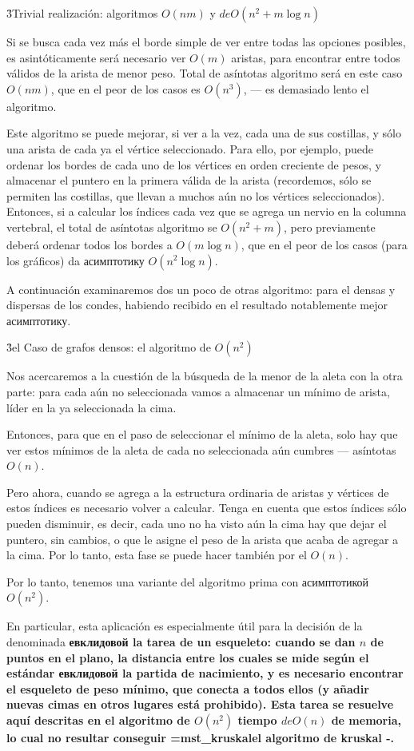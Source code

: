 \h3{Trivial realización: algoritmos $O(n m)$ y $de O(n^2 + m \log n)$}

Si se busca cada vez más el borde simple de ver entre todas las opciones posibles, es asintóticamente será necesario ver $O(m)$ aristas, para encontrar entre todos válidos de la arista de menor peso. Total de asíntotas algoritmo será en este caso $O(nm)$, que en el peor de los casos es $O(n^3)$, --- es demasiado lento el algoritmo.

Este algoritmo se puede mejorar, si ver a la vez, cada una de sus costillas, y sólo una arista de cada ya el vértice seleccionado. Para ello, por ejemplo, puede ordenar los bordes de cada uno de los vértices en orden creciente de pesos, y almacenar el puntero en la primera válida de la arista (recordemos, sólo se permiten las costillas, que llevan a muchos aún no los vértices seleccionados). Entonces, si a calcular los índices cada vez que se agrega un nervio en la columna vertebral, el total de asíntotas algoritmo se $O(n^2 + m)$, pero previamente deberá ordenar todos los bordes a $O(m \log n)$, que en el peor de los casos (para los gráficos) da асимптотику $O(n^2 \log n)$.

A continuación examinaremos dos un poco de otras algoritmo: para el densas y dispersas de los condes, habiendo recibido en el resultado notablemente mejor асимптотику.


\h3{el Caso de grafos densos: el algoritmo de $O(n^2)$}

Nos acercaremos a la cuestión de la búsqueda de la menor de la aleta con la otra parte: para cada aún no seleccionada vamos a almacenar un mínimo de arista, líder en la ya seleccionada la cima.

Entonces, para que en el paso de seleccionar el mínimo de la aleta, solo hay que ver estos mínimos de la aleta de cada no seleccionada aún cumbres --- asíntotas $O(n)$.

Pero ahora, cuando se agrega a la estructura ordinaria de aristas y vértices de estos índices es necesario volver a calcular. Tenga en cuenta que estos índices sólo pueden disminuir, es decir, cada uno no ha visto aún la cima hay que dejar el puntero, sin cambios, o que le asigne el peso de la arista que acaba de agregar a la cima. Por lo tanto, esta fase se puede hacer también por el $O(n)$.

Por lo tanto, tenemos una variante del algoritmo prima con асимптотикой $O(n^2)$.

En particular, esta aplicación es especialmente útil para la decisión de la denominada \bf{евклидовой la tarea de un esqueleto}: cuando se dan $n$ de puntos en el plano, la distancia entre los cuales se mide según el estándar евклидовой la partida de nacimiento, y es necesario encontrar el esqueleto de peso mínimo, que conecta a todos ellos (y añadir nuevas cimas en otros lugares está prohibido). Esta tarea se resuelve aquí descritas en el algoritmo de $O(n^2)$ tiempo $de O(n)$ de memoria, lo cual no resultar conseguir \algohref=mst_kruskal{el algoritmo de kruskal -}.

